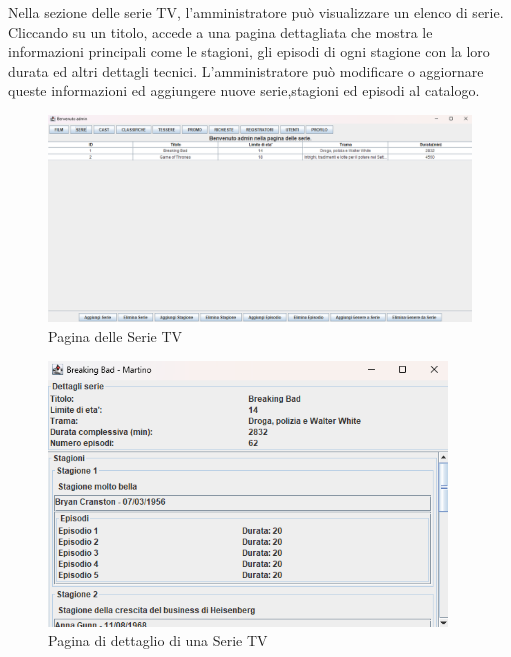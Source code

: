 \documentclass[a4paper,12pt]{report}
\begin{document}
Nella sezione delle serie TV, l'amministratore può visualizzare un elenco di serie. Cliccando su un titolo, accede a una pagina dettagliata che mostra le informazioni principali come le stagioni, gli episodi di ogni stagione con la loro durata ed altri dettagli tecnici. L'amministratore può modificare o aggiornare queste informazioni ed aggiungere nuove serie,stagioni ed episodi al catalogo. \\
\begin{figure}[H]
	\centering
	\includegraphics[width=375pt]{appimg/adminImages/sezioneserie.png}
	\caption{Pagina delle Serie TV}
\end{figure}
\begin{figure}[H]
	\centering
	\includegraphics[width=300pt]{appimg/adminImages/dettagliserie.png}
	\caption{Pagina di dettaglio di una Serie TV}
\end{figure}
\end{document}
